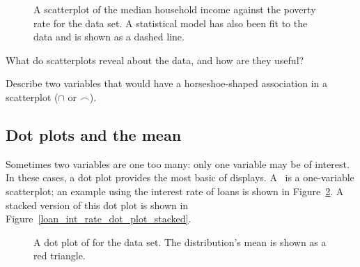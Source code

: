 \begin{figure}[h]
  \centering
  \caption{A scatterplot of the median household income
      against the poverty rate for the
       data set.
      A statistical model has also been fit to the data
      and is shown as a dashed line.}
  \label{medianHHIncomePoverty}
\end{figure}

\begin{exercisewrap}
\begin{nexercise}
What do scatterplots reveal about the data,
and how are they useful?\footnotemark{}
\end{nexercise}
\end{exercisewrap}

\begin{exercisewrap}
\begin{nexercise}
Describe two variables that would have a horseshoe-shaped
association in a scatterplot ($\cap$ or $\frown$).\footnotemark{}
\end{nexercise}
\end{exercisewrap}



\subsection{Dot plots and the mean}
\label{dotPlot}

Sometimes two variables are one too many:
only one variable may be of interest.
In these cases, a dot plot provides the most basic of displays.
A~ is a one-variable scatterplot;
an example using the interest rate of \loanN{} loans
is shown in Figure~\ref{loan_int_rate_dot_plot}.
A stacked version of this dot plot is shown in
Figure~\ref{loan_int_rate_dot_plot_stacked}.

\begin{figure}[h]
  \centering
  \caption{A dot plot of 
      for the  data set.
      The distribution's mean is shown as a red triangle.}
  \label{loan_int_rate_dot_plot}
\end{figure}

